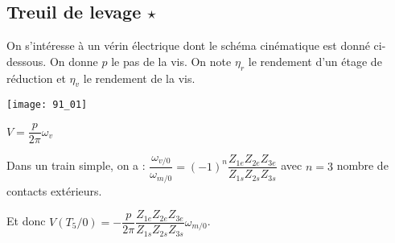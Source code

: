 \normaltrue \difficilefalse \tdifficilefalse
\correctionfalse


\subsection*{Treuil de levage $\star$ \label{CIN:03:C2:06:91}}
\setcounter{question}{0}

\ifcorrection
\else
{}
\fi

\ifprof
\else
On s’intéresse à un vérin électrique dont le schéma cinématique est donné ci-dessous. On donne $p$ le pas de la vis. On note $\eta_r$ le rendement d'un étage de réduction et $\eta_v$ le rendement de la vis.
\begin{marginfigure}
\texttt{[image: 91\_01]}
\end{marginfigure}


\fi


\ifprof
\begin{corrige}
$V =\dfrac{p}{2\pi} \omega_v$
\end{corrige}
\else
\fi

\ifprof 
\begin{corrige}
Dans un train simple, on a : $\dfrac{\omega_{v/0}}{\omega_{m/0}} = (-1)^n \dfrac{Z_{1e}Z_{2e}Z_{3e}}{Z_{1s}Z_{2s}Z_{3s}}$ avec $n=3$ nombre de contacts extérieurs.

Et donc $V(T_5/0) =-\dfrac{p}{2\pi} \dfrac{Z_{1e}Z_{2e}Z_{3e}}{Z_{1s}Z_{2s}Z_{3s}} \omega_{m/0}$.

\end{corrige}
\else

\fi





\ifprof
\else


\fi